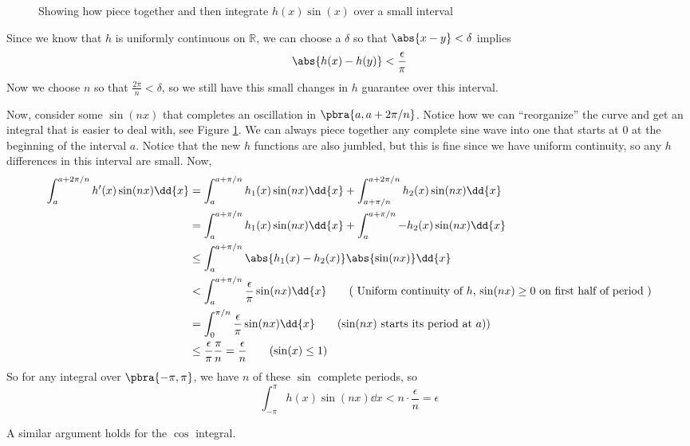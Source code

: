 {\begin{figure}[H]
  \caption{
    Showing how piece together and then integrate $h(x)\sin(x)$ over a small interval
  }
  \label{chap8:fig:sine_integral}
\end{figure}

Since we know that $h$ is uniformly continuous on $\mathbb{R}$,
we can choose a $\delta$ so that $\abs{x - y} < \delta$ implies 
\begin{equation*}
  \abs{
    h(x) - h(y)
  } < \frac{\epsilon}{\pi}
\end{equation*}
Now we choose $n$ so that $\frac{2\pi}{n} < \delta$, so we still 
have this small changes in $h$ guarantee over this interval.

Now, consider some $\sin(nx)$ that completes an oscillation in 
$\pbra{a, a+2\pi/n}$. Notice how we can ``reorganize'' the curve 
and get an integral that is easier to deal with, see Figure 
\ref{chap8:fig:sine_integral}.
We can always piece together any complete sine wave into one
that starts at $0$ at the beginning of the interval 
$a$. Notice that the new $h$ functions are also jumbled, but
this is fine since we have uniform continuity, so any $h$ differences 
in this interval are small. Now,
\begin{align*}
  \int_{a}^{a+2\pi/n} h'(x)\sin(nx) \dd{x} 
  &= 
  \int_{a}^{a+\pi/n} h_1(x)\sin(nx) \dd{x} +
  \int_{a+\pi/n}^{a+2\pi/n} h_2(x)\sin(nx) \dd{x}\\
  &= 
  \int_{a}^{a+\pi/n} h_1(x)\sin(nx) \dd{x} +
  \int_{a}^{a+\pi/n} -h_2(x)\sin(nx) \dd{x}\\
  &\leq
  \int_{a}^{a+\pi/n} \abs{h_1(x)-h_2(x)}\abs{\sin(nx)} \dd{x}\\
  &<
  \int_{a}^{a+\pi/n} \frac{\epsilon}{\pi}\sin(nx) \dd{x}\tag{
    Uniform continuity of $h$, $\sin(nx) \geq 0$ on first half of period
  }\\
  &=
  \int_{0}^{\pi/n} \frac{\epsilon}{\pi}\sin(nx) \dd{x} 
  \tag{$\sin(nx)$ starts its period at $a$)}\\
  &\leq
  \frac{\epsilon}{\pi} \frac{\pi}{n} = \frac{\epsilon}{n}
  \tag{$\sin(x) \leq 1$}
\end{align*}
So for any integral over $\pbra{-\pi, \pi}$, 
we have $n$ of these $\sin$ complete periods, so 
\begin{equation*}
  \int_{-\pi}^\pi h(x)\sin(nx) \dd{x} < n \cdot \frac{\epsilon}{n} = \epsilon
\end{equation*}

A similar argument holds for the $\cos$ integral.
}

